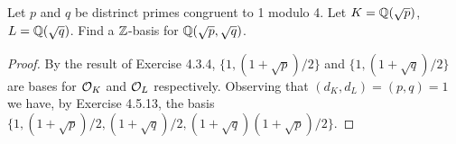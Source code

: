 \documentclass[10pt]{amsart}
\begin{document}
%    

\begin{thm}
  \label{Ex5}
  Let $p$ and $q$ be distrinct primes congruent to 1 modulo 4.
  Let $K = \mathbb{Q}(\sqrt{p})$, $L = \mathbb{Q}(\sqrt{q})$.
  Find a $\mathbb{Z}$-basis for $\mathbb{Q}(\sqrt{p},\sqrt{q})$.
  
  \begin{proof}
    By the result of Exercise 4.3.4, $\{1, (1 + \sqrt{p})/2\}$ and $\{1, (1 + \sqrt{q})/2\}$ are bases for $\mathcal{O}_K$ and $\mathcal{O}_L$ respectively.
    Observing that $(d_K,d_L) = (p,q) = 1$ we have, by Exercise 4.5.13, the basis $\{1, (1 + \sqrt{p})/2, (1 + \sqrt{q})/2, (1 + \sqrt{q})(1 + \sqrt{p})/2\}$.
  \end{proof}
\end{thm}
\end{document}
